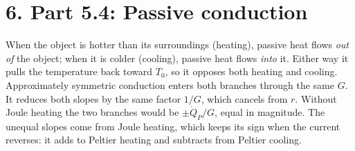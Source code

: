 \documentclass[reprint, amsmath, amssymb, aps]{revtex4-2}
\newcommand{\Qdot}{\dot Q}
\begin{document}
\section*{6. Part 5.4: Passive conduction}

When the object is hotter than its surroundings (heating), passive heat flows \emph{out of}
the object; when it is colder (cooling), passive heat flows \emph{into} it. Either way it
pulls the temperature back toward $T_0$, so it opposes both heating and cooling.
Approximately symmetric conduction enters both branches through the same $G$. It reduces both
slopes by the same factor $1/G$, which cancels from $r$. Without Joule heating the two branches
would be $\pm\Qdot_P/G$, equal in magnitude. The unequal slopes come from Joule heating, which
keeps its sign when the current reverses: it adds to Peltier heating and subtracts from
Peltier cooling.
\end{document}
